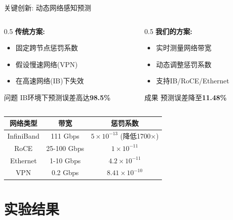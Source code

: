 \documentclass[aspectratio=169,10pt]{beamer}
\begin{document}
\begin{frame}{关键创新: 动态网络感知预测}
\begin{columns}
\begin{column}{0.5\textwidth}
\textbf{传统方案:}
\begin{itemize}
    \item 固定跨节点惩罚系数
    \item 假设慢速网络(VPN)
    \item 在高速网络(IB)下失效
\end{itemize}
\vspace{0.3cm}
\begin{alertblock}{问题}
IB环境下预测误差高达\textbf{98.5\%}
\end{alertblock}
\end{column}
\begin{column}{0.5\textwidth}
\textbf{我们的方案:}
\begin{itemize}
    \item 实时测量网络带宽
    \item 动态调整惩罚系数
    \item 支持IB/RoCE/Ethernet
\end{itemize}
\vspace{0.3cm}
\begin{block}{成果}
预测误差降至\textbf{11.48\%}
\end{block}
\end{column}
\end{columns}
\vspace{0.5cm}
\begin{center}
\begin{tabular}{ccc}
\toprule
\textbf{网络类型} & \textbf{带宽} & \textbf{惩罚系数} \\
\midrule
InfiniBand & 111 Gbps & $5\times10^{-13}$ (降低1700×) \\
RoCE & 25-100 Gbps & $1\times10^{-11}$ \\
Ethernet & 1-10 Gbps & $4.2\times10^{-11}$ \\
VPN & 0.2 Gbps & $8.41\times10^{-10}$ \\
\bottomrule
\end{tabular}
\end{center}
\end{frame}

\section{实验结果}
\end{document}
